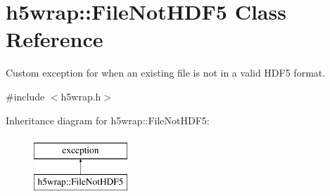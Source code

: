 \hypertarget{classh5wrap_1_1_file_not_h_d_f5}{\section{h5wrap\-:\-:File\-Not\-H\-D\-F5 Class Reference}
\label{classh5wrap_1_1_file_not_h_d_f5}
}


Custom exception for when an existing file is not in a valid H\-D\-F5 format.  




{\ttfamily \#include $<$h5wrap.\-h$>$}

Inheritance diagram for h5wrap\-:\-:File\-Not\-H\-D\-F5\-:\begin{figure}[H]
\begin{center}
\leavevmode
\includegraphics[height=2.000000cm]{classh5wrap_1_1_file_not_h_d_f5}
\end{center}
\end{figure}
